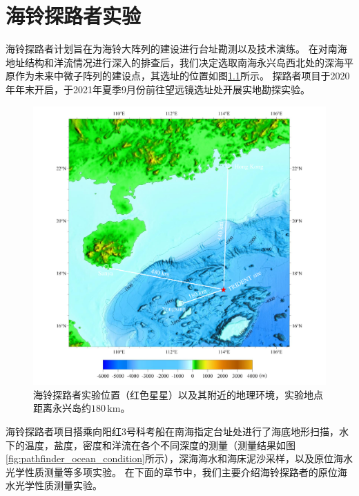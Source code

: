 \chapter{海铃探路者实验}
\label{chap:pathfinder}

海铃探路者计划\cite{TRIDENT_pathfinder:2022}旨在为海铃大阵列的建设进行台址勘测以及技术演练。
在对南海地址结构和洋流情况进行深入的排查后，我们决定选取南海永兴岛西北处的深海平原作为未来中微子阵列的建设点，其选址的位置如图\ref{fig:pathfinder_map}所示。
探路者项目于2020年年末开启，于2021年夏季9月份前往望远镜选址处开展实地勘探实验。

\begin{figure}[htb]
    \centering
    \includegraphics[width=0.8\linewidth]{img/pathfinder_map.pdf}
    \caption{海铃探路者实验位置（红色星星）以及其附近的地理环境，实验地点距离永兴岛约$180\,\mathrm{km}$。}
    \label{fig:pathfinder_map}
\end{figure}

海铃探路者项目搭乘向阳红3号科考船在南海指定台址处进行了海底地形扫描，水下的温度，盐度，密度和洋流在各个不同深度的测量（测量结果如图\ref{fig:pathfinder_ocean_condition}所示），深海海水和海床泥沙采样，以及原位海水光学性质测量等多项实验。
在下面的章节中，我们主要介绍海铃探路者的原位海水光学性质测量实验。


